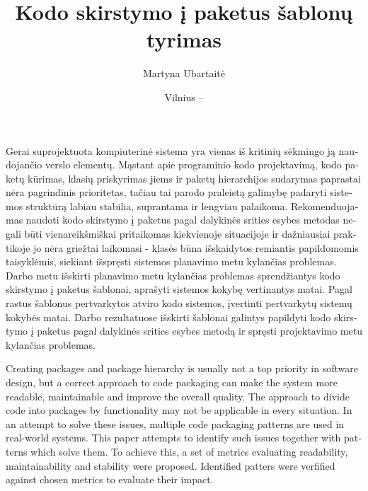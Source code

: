\documentclass[
]{VUMIFPSbakalaurinis}
\title{Kodo skirstymo į paketus šablonų tyrimas}
\author{Martyna Ubartaitė}
\date{Vilnius – \the\year}
\begin{document}
\maketitle


\begin{lithuanian}
Gerai suprojektuota kompiuterinė sistema yra vienas iš kritinių sėkmingo ją naudojančio verslo
elementų.
Mąstant apie programinio kodo
projektavimą, kodo paketų kūrimas, klasių priskyrimas jiems ir paketų hierarchijos sudarymas paprastai
nėra pagrindinis prioritetas, tačiau tai parodo praleistą galimybę padaryti sistemos struktūrą labiau
stabilia, suprantama ir lengviau palaikoma.
Rekomenduojamas naudoti kodo skirstymo į paketus pagal dalykinės srities esybes metodas negali būti vienareikšmiškai pritaikomas
kiekvienoje situacijoje ir dažniausiai praktikoje jo nėra griežtai laikomasi - klasės būna išskaidytos remiantis papildomomis taisyklėmis,
siekiant išspręsti sistemos planavimo metu kylančias problemas.
Darbo metu išskirti planavimo metu kylančias problemas sprendžiantys kodo skirstymo į paketus šablonai, aprašyti sistemos
kokybę vertinantys matai.
Pagal rastus šablonus pertvarkytos atviro kodo sistemos, įvertinti pertvarkytų sistemų kokybės matai.
Darbo rezultatuose išskirti šablonai galintys papildyti kodo skirstymo į paketus pagal dalykinės srities esybes metodą ir spręsti
projektavimo metu kylančias problemas.

\end{lithuanian}

\begin{english}
Creating packages and package hierarchy is usually not a top priority in software design, but
a correct approach to code packaging can make the system more readable, maintainable and improve the overall quality.
The approach to divide code into packages by functionality may not be applicable in every situation.
In an attempt to solve these issues, multiple code packaging patterns are used in real-world systems.
This paper attempts to identify such issues together with patterns which solve them.
To achieve this, a set of metrics evaluating readability, maintainability and stability were proposed.
Identified patters were verfified against chosen metrics to evaluate their impact.

\end{english}
\end{document}
